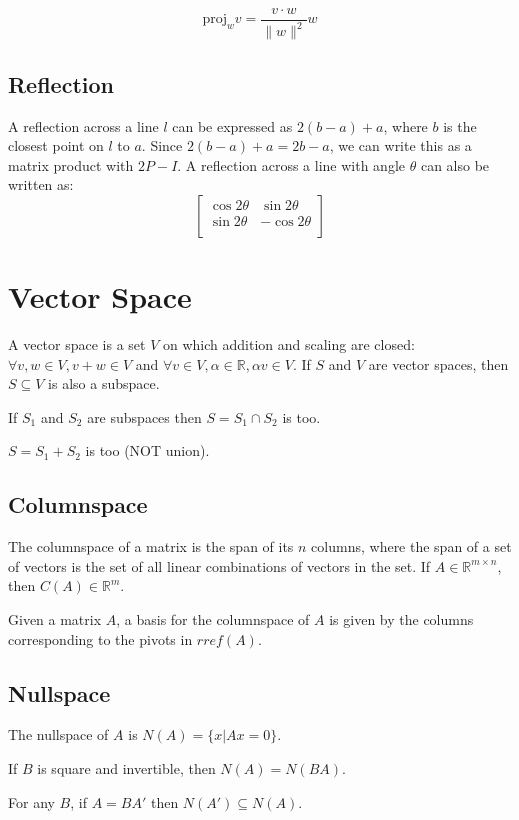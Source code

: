 \documentclass[10pt]{extarticle}
\newcommand{\R}{\mathbb{R}}
\begin{document}
\begin{multicols*}{2}
\[ \text{proj}_w v = \frac{v \cdot w}{\|w\|^2}w \]

\subsection{Reflection}
A reflection across a line $l$ can be expressed as $2(b-a) + a$, where $b$ is the closest point on $l$ to $a$. Since $2(b-a)+a = 2b - a$, we can write this as a matrix product with $2P-I$. A reflection across a line with angle $\theta$ can also be written as:
\begin{equation*}
	\begin{bmatrix}
		\cos 2\theta & \sin 2\theta \\
		\sin 2\theta & -\cos 2\theta \\
	\end{bmatrix}
\end{equation*}

\section{Vector Space}
A vector space is a set $V$ on which addition and scaling are closed: $\forall v, w \in V, v+w \in V$ and $\forall v \in V, \alpha \in \R, \alpha v \in V$. If $S$ and $V$ are vector spaces, then $S \subseteq V$ is also a subspace.

\begin{compactitem}
	\item If $S_1$ and $S_2$ are subspaces then $S = S_1 \cap S_2$ is too.	
	\item $S = S_1 + S_2$ is too (NOT union).
\end{compactitem}

\subsection{Columnspace}
The columnspace of a matrix is the span of its $n$ columns, where the span of a set of vectors is the set of all linear combinations of vectors in the set. If $A \in \R^{m \times n}$, then $C(A) \in \R^m$.

Given a matrix $A$, a basis for the columnspace of $A$ is given by the columns corresponding to the pivots in $rref(A)$.

\subsection{Nullspace}
The nullspace of $A$ is $N(A) = \{x | Ax=0\}$.
\begin{compactitem}
\item If $B$ is square and invertible, then $N(A) = N(BA)$.
\item For any $B$, if $A = BA'$ then $N(A') \subseteq N(A)$.
\end{compactitem}


\end{multicols*}
\end{document}
